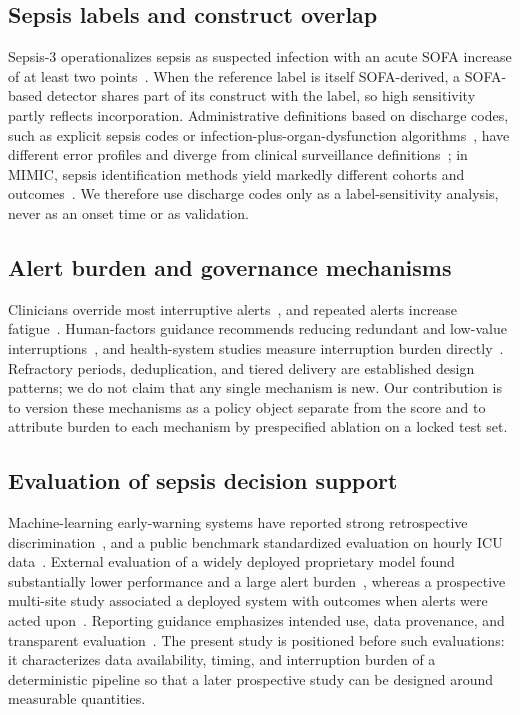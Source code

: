 \documentclass[journal]{IEEEtran}
\begin{document}
\subsection{Sepsis labels and construct overlap}
Sepsis-3 operationalizes sepsis as suspected infection with an acute SOFA
increase of at least two points~\cite{singer2016,seymour2016}. When the
reference label is itself SOFA-derived, a SOFA-based detector shares part of
its construct with the label, so high sensitivity partly reflects
incorporation. Administrative definitions based on discharge codes, such as
explicit sepsis codes or infection-plus-organ-dysfunction
algorithms~\cite{angus2001,martin2003}, have different error profiles and
diverge from clinical surveillance definitions~\cite{rhee2017}; in MIMIC,
sepsis identification methods yield markedly different cohorts and
outcomes~\cite{johnson2018sepsis}. We therefore use discharge codes only as a
label-sensitivity analysis, never as an onset time or as validation.

\subsection{Alert burden and governance mechanisms}
Clinicians override most interruptive alerts~\cite{vandersijs2006}, and
repeated alerts increase fatigue~\cite{ancker2017,embi2012}. Human-factors
guidance recommends reducing redundant and low-value
interruptions~\cite{phansalkar2010}, and health-system studies measure
interruption burden directly~\cite{elias2019}. Refractory periods,
deduplication, and tiered delivery are established design patterns; we do not
claim that any single mechanism is new. Our contribution is to version these
mechanisms as a policy object separate from the score and to attribute burden
to each mechanism by prespecified ablation on a locked test set.

\subsection{Evaluation of sepsis decision support}
Machine-learning early-warning systems have reported strong retrospective
discrimination~\cite{henry2015,nemati2018,moor2021}, and a public benchmark
standardized evaluation on hourly ICU data~\cite{reyna2020}. External
evaluation of a widely deployed proprietary model found substantially lower
performance and a large alert burden~\cite{wong2021}, whereas a prospective
multi-site study associated a deployed system with outcomes when alerts were
acted upon~\cite{adams2022}. Reporting guidance emphasizes intended use,
data provenance, and transparent evaluation~\cite{collins2024,wiens2019}. The
present study is positioned before such evaluations: it characterizes data
availability, timing, and interruption burden of a deterministic pipeline so
that a later prospective study can be designed around measurable quantities.
\end{document}
